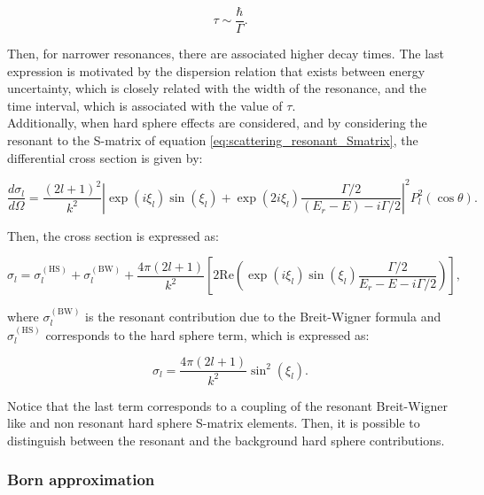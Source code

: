 \documentclass[openany]{book}
\begin{document}
\begin{equation} \label{eq:scattering_resonant_tau}
	\tau \sim \frac{\hbar}{\Gamma}.
\end{equation}

Then, for narrower resonances, there are associated higher decay times. The last expression is motivated by the dispersion relation that exists between energy uncertainty, which is closely related with the width of the resonance, and the time interval, which is associated with the value of $\tau$. \\

Additionally, when hard sphere effects are considered, and by considering the resonant to the S-matrix of equation \ref{eq:scattering_resonant_Smatrix}, the differential cross section is given by: 

\begin{equation} \label{eq:scattering_resonant_hardSphere_differentialCrossSection}
	\frac{d\sigma_l}{d\Omega} =  \frac{(2l + 1)^2}{k^2} \left | \exp(i\xi_l)\sin(\xi_l) + \exp(2i\xi_l) \frac{\Gamma/2}{(E_r - E) - i\Gamma/2} \right|^2  P^2_l(\cos \theta ).
\end{equation}

Then, the cross section is expressed as: 

\begin{equation} \label{eq:scattering_resonant_hardSphere_total}
	\sigma_l = \sigma^{(\mathrm{HS})}_{l} + \sigma^{(\mathrm{BW})}_{l} + \frac{4\pi(2l + 1)}{k^2} \left [ 2 \mathrm{Re} \left ( \exp(i\xi_l) \sin (\xi_l) \frac{\Gamma/2}{E_r - E - i\Gamma/2}\right )  \right ],
\end{equation}

where $\sigma^{(\mathrm{BW})}_{l}$ is the resonant contribution due to the Breit-Wigner formula and $\sigma^{(\mathrm{HS})}_{l} $ corresponds to the hard sphere term, which is expressed as: 

\begin{equation} \label{eq:scattering_resonant_hardSphere}
	\sigma_l = \frac{4\pi(2l + 1)}{k^2}  \sin^2 (\xi_l).
\end{equation}

Notice that the last term corresponds to a coupling of the resonant Breit-Wigner like and non resonant hard sphere S-matrix elements. Then, it is possible to distinguish between the resonant  and the background hard sphere contributions.
 


\subsubsection{Born approximation}
\end{document}
